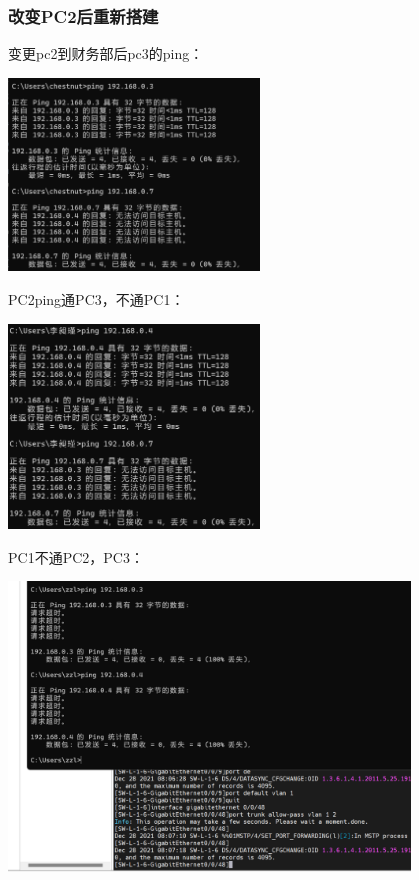 \documentclass{article}
\begin{document}
\subsubsection{改变PC2后重新搭建}
变更pc2到财务部后pc3的ping：

\vspace{10pt}
\centerline{\includegraphics[width=0.5\textwidth]{2_5_images/9.png}}
\vspace{10pt}
PC2ping通PC3，不通PC1：

\vspace{10pt}
\centerline{\includegraphics[width=0.5\textwidth]{2_5_images/10.png}}
\vspace{10pt}
PC1不通PC2，PC3：

\vspace{10pt}
\centerline{\includegraphics[width=0.8\textwidth]{2_5_images/11.png}}
\vspace{10pt}
\end{document}

